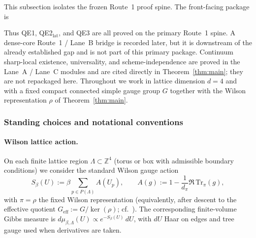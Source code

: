 This subsection isolates the frozen Route~1 proof spine.
The front-facing package is
\begin{center}
\end{center}
Thus QE1, QE2$_{\mathrm{lat}}$, and QE3 are all proved on the primary Route~1 spine.
A dense-core Route~1 / Lane~B bridge is recorded later, but it is downstream of the already established gap and is not part of this primary package.
Continuum sharp-local existence, universality, and scheme-independence are proved in the Lane~A / Lane~C modules and are cited directly in Theorem~\ref{thm:main}; they are not repackaged here.
Throughout we work in lattice dimension $d=4$ and with a fixed compact connected simple gauge group $G$ together with the Wilson representation $\rho$ of Theorem~\ref{thm:main}.

\subsubsection{Standing choices and notational conventions}

\paragraph{Wilson lattice action.}
On each finite lattice region $\Lambda\subset\mathbb Z^4$ (torus or box with admissible boundary conditions) we consider the standard Wilson gauge action
\begin{equation}
 S_{\beta}(U):=\beta\sum_{p\in P(\Lambda)} A(U_p),
 \qquad A(g):=1-\frac{1}{d_{\pi}}\Re\,\mathrm{Tr}_{\pi}(g),
 \label{eq:wilson_action_main}
\end{equation}
with $\pi=\rho$ the fixed Wilson representation (equivalently, after descent to the effective quotient $G_{\mathrm{eff}}:=G/\ker(\rho)$; cf.\ ).
The corresponding finite-volume Gibbs measure is
\(d\mu_{\beta,\Lambda}(U)\propto e^{-S_{\beta}(U)}\,dU\), with $dU$ Haar on edges and tree gauge used when derivatives are taken.

